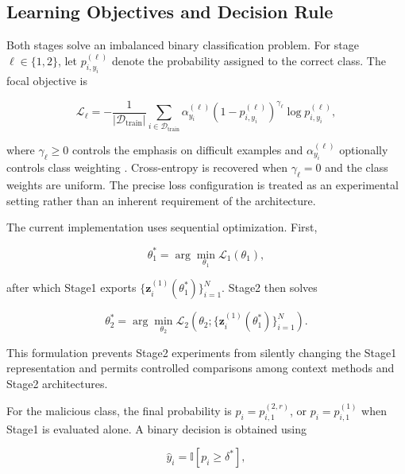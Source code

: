 \subsection{Learning Objectives and Decision Rule}
\label{subsec:learning_objectives}

Both stages solve an imbalanced binary classification problem. For stage
$\ell\in\{1,2\}$, let $p^{(\ell)}_{i,y_i}$ denote the probability assigned to
the correct class. The focal objective is

\begin{equation}
\mathcal{L}_{\ell}
=
-\frac{1}{|\mathcal{D}_{\mathrm{train}}|}
\sum_{i\in\mathcal{D}_{\mathrm{train}}}
\alpha^{(\ell)}_{y_i}
\left(
    1-p^{(\ell)}_{i,y_i}
\right)^{\gamma_{\ell}}
\log p^{(\ell)}_{i,y_i},
\label{eq:focal_objective}
\end{equation}

where $\gamma_{\ell}\geq0$ controls the emphasis on difficult examples and
$\alpha^{(\ell)}_{y_i}$ optionally controls class weighting
\cite{Lin2017FocalLoss}. Cross-entropy is recovered when
$\gamma_{\ell}=0$ and the class weights are uniform. The precise loss
configuration is treated as an experimental setting rather than an inherent
requirement of the architecture.

The current implementation uses sequential optimization. First,

\begin{equation}
\theta_1^{*}
=
\arg\min_{\theta_1}
\mathcal{L}_{1}(\theta_1),
\end{equation}

after which Stage1 exports
$\{\mathbf{z}^{(1)}_i(\theta_1^{*})\}_{i=1}^{N}$. Stage2 then solves

\begin{equation}
\theta_2^{*}
=
\arg\min_{\theta_2}
\mathcal{L}_{2}
\left(
    \theta_2;
    \{\mathbf{z}^{(1)}_i(\theta_1^{*})\}_{i=1}^{N}
\right).
\end{equation}

This formulation prevents Stage2 experiments from silently changing the
Stage1 representation and permits controlled comparisons among context methods
and Stage2 architectures.

For the malicious class, the final probability is
$p_i=p^{(2,r)}_{i,1}$, or $p_i=p^{(1)}_{i,1}$ when Stage1 is evaluated alone. A
binary decision is obtained using

\begin{equation}
\widehat{y}_i
=
\mathbb{I}[p_i\geq\delta^{*}],
\end{equation}

